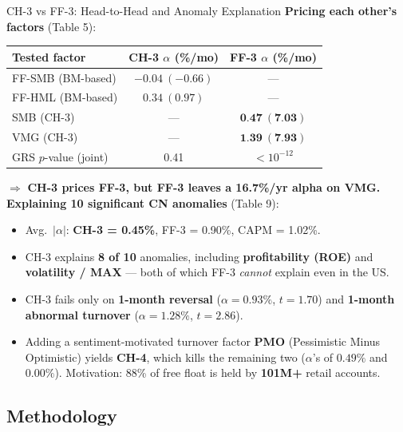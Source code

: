 \documentclass{beamer}
\begin{document}
\begin{frame}{CH-3 vs FF-3: Head-to-Head and Anomaly Explanation}
	\small
	\textbf{Pricing each other's factors} (Table 5):
	\begin{table}
		\centering
		\footnotesize
		\begin{tabular}{lcc}
			\hline
			Tested factor & CH-3 $\alpha$ (\%/mo) & FF-3 $\alpha$ (\%/mo) \\
			\hline
			FF-SMB (BM-based) & $-0.04~(-0.66)$ & --- \\
			FF-HML (BM-based) & $0.34~(0.97)$ & --- \\
			SMB (CH-3) & --- & $\textbf{0.47}~(\textbf{7.03})$ \\
			VMG (CH-3) & --- & $\textbf{1.39}~(\textbf{7.93})$ \\
			\hline
			GRS $p$-value (joint) & 0.41 & $< 10^{-12}$ \\
			\hline
		\end{tabular}
	\end{table}
	$\Rightarrow$ \textbf{CH-3 prices FF-3, but FF-3 leaves a 16.7\%/yr alpha on VMG.}
	\vspace{4pt}
	\textbf{Explaining 10 significant CN anomalies} (Table 9):
	\begin{itemize}\setlength\itemsep{1pt}
		\item Avg.\ $|\alpha|$: \textbf{CH-3 = 0.45\%}, FF-3 = 0.90\%, CAPM = 1.02\%.
		\item CH-3 explains \textbf{8 of 10} anomalies, including \textbf{profitability (ROE)} and \textbf{volatility / MAX} --- both of which FF-3 \textit{cannot} explain even in the US.
		\item CH-3 fails only on \textbf{1-month reversal} ($\alpha = 0.93\%$, $t=1.70$) and \textbf{1-month abnormal turnover} ($\alpha = 1.28\%$, $t=2.86$).
		\item Adding a sentiment-motivated turnover factor \textbf{PMO} (Pessimistic Minus Optimistic) yields \textbf{CH-4}, which kills the remaining two ($\alpha$'s of $0.49\%$ and $0.00\%$). Motivation: 88\% of free float is held by \textbf{101M+} retail accounts.
	\end{itemize}
\end{frame}




\subsection{Methodology}
\end{document}
